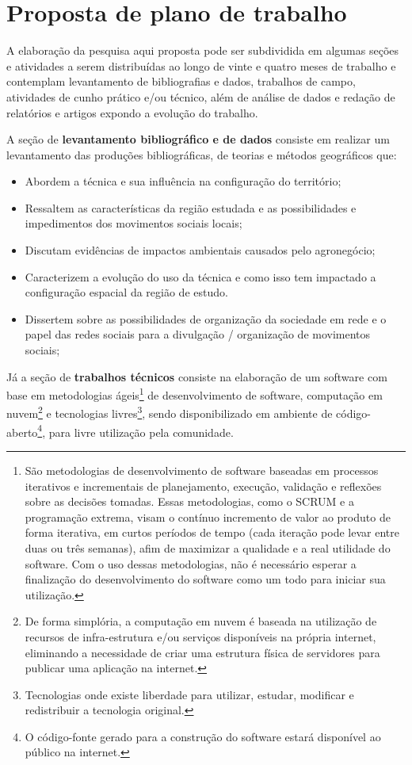 \section{Proposta de plano de trabalho}

A elaboração da pesquisa aqui proposta pode ser subdividida em algumas seções e atividades a serem distribuídas ao longo de vinte e quatro meses de trabalho e contemplam levantamento de bibliografias e dados, trabalhos de campo, atividades de cunho prático e/ou técnico, além de análise de dados e redação de relatórios e artigos expondo a evolução do trabalho.

A seção de \textbf{levantamento bibliográfico e de dados} consiste em realizar um levantamento das produções bibliográficas, de teorias e métodos geográficos que:

\begin{itemize}
 \item Abordem a técnica e sua influência na configuração do território;
 \item Ressaltem as características da região estudada e as possibilidades e impedimentos dos movimentos sociais locais;
 \item Discutam evidências de impactos ambientais causados pelo agronegócio;
 \item Caracterizem a evolução do uso da técnica e como isso tem impactado a configuração espacial da região de estudo.
 \item Dissertem sobre as possibilidades de organização da sociedade em rede e o papel das redes sociais para a divulgação / organização de movimentos sociais;
\end{itemize}

Já a seção de \textbf{trabalhos técnicos} consiste na elaboração de um software com base em metodologias ágeis\footnote{São metodologias de desenvolvimento de software baseadas em processos iterativos e incrementais de planejamento, execução, validação e reflexões sobre as decisões tomadas. Essas metodologias, como o SCRUM e a programação extrema, visam o contínuo incremento de valor ao produto de forma iterativa, em curtos períodos de tempo (cada iteração pode levar entre duas ou três semanas), afim de maximizar a qualidade e a real utilidade do software. Com o uso dessas metodologias, não é necessário esperar a finalização do desenvolvimento do software como um todo para iniciar sua utilização.} de desenvolvimento de software, computação em nuvem\footnote{De forma simplória, a computação em nuvem é baseada na utilização de recursos de infra-estrutura e/ou serviços disponíveis na própria internet, eliminando a necessidade de criar uma estrutura física de servidores para publicar uma aplicação na internet.} e tecnologias livres\footnote{Tecnologias onde existe liberdade para utilizar, estudar, modificar e redistribuir a tecnologia original.}, sendo disponibilizado em ambiente de código-aberto\footnote{O código-fonte gerado para a construção do software estará disponível ao público na internet.}, para livre utilização pela comunidade.

